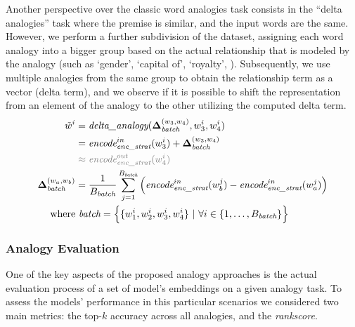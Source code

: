 Another perspective over the classic word analogies task consists in the ``delta analogies'' task where the premise is similar, and the input words are the same.
However, we perform a further subdivision of the dataset, assigning each word analogy into a bigger group based on the actual relationship that is modeled by the analogy (such as `gender', `capital of', `royalty', ).
Subsequently, we use multiple analogies from the same group to obtain the relationship term as a vector (delta term), and we observe if it is possible to shift the representation from an element of the analogy to the other utilizing the computed delta term.
\begin{equation}
    \label{eq:method_embeddings_delta-analogy-function}
    \begin{aligned}
        \tilde{w}^i &= \textit{delta\_analogy}(\gbm{\Delta}_{\textit{batch}}^{(w_3, w_4)}, w_3^i, w_4^i) \\
        &= {\textit{encode}}_{\textit{enc\_strat}}^{in}(w_3^i) + \gbm{\Delta}_{\textit{batch}}^{(w_3, w_4)} \\
        &\color{gray} \approx {\textit{encode}}_{\textit{enc\_strat}}^{out}(w_4^i) \\
        \gbm{\Delta}_{\textit{batch}}^{(w_a, w_b)} &= \frac{1}{B_{\textit{batch}}}\sum_{j=1}^{B_{\textit{batch}}}{\Bigl({\textit{encode}}_{\textit{enc\_strat}}^{in}(w_b^j) - {\textit{encode}}_{\textit{enc\_strat}}^{in}(w_a^j)\Bigr)} \\
        \text{where}&\ \textit{batch} = \Bigl\{ \{w_1^i, w_2^i, w_3^i, w_4^i\} \ |\ \forall i \in \{1,\ldots, B_{\textit{batch}}\} \Bigr\}
    \end{aligned}
\end{equation}

\subsubsection{Analogy Evaluation} \label{subsubsec:method_embeddings_evaluation}

One of the key aspects of the proposed analogy approaches is the actual evaluation process of a set of model's embeddings on a given analogy task.
To assess the models' performance in this particular scenarios we considered two main metrics: the top-$k$ accuracy across all analogies, and the \emph{rankscore}.

